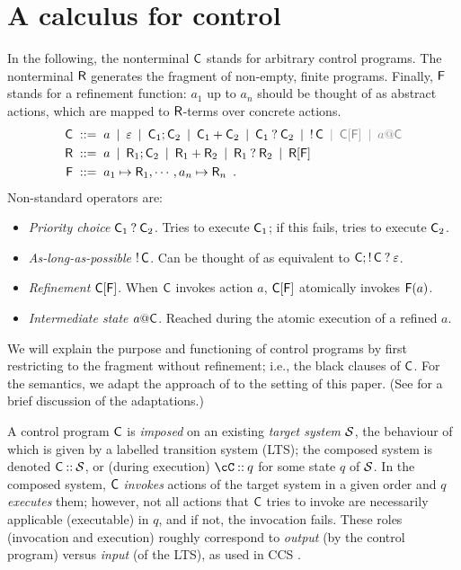 \section{A calculus for control}
\label{sec:calculus}

In the following, the nonterminal $\mathsf{C}$ stands for arbitrary control programs. The nonterminal $\mathsf{R}$ generates the fragment of non-empty, finite programs. Finally, $\mathsf{F}$ stands for a refinement function: $a_1$ up to $a_n$ should be thought of as abstract actions, which are mapped to $\mathsf{R}$-terms over concrete actions.
%
\begin{align*}
\rC & \ruleis a \rulemid \term \rulemid \rC_1;\rC_2 \rulemid \rC_1+\rC_2 \rulemid \rC_1\orelse \rC_2 \rulemid \alap \rC \color{gray} \rulemid \rC[\rF] \rulemid a@\rC \color{black} \\
\rR & \ruleis a \rulemid \rR_1;\rC_2 \rulemid \rR_1+\rR_2 \rulemid \rR_1\orelse \rR_2 \rulemid \rR[\rF] \\
\rF & \ruleis a_1 \mapsto \rR_1, \cdots, a_n\mapsto \rR_n \enspace.
\end{align*}
%
Non-standard operators are:
\begin{itemize}
\item \emph{Priority choice} $\mathsf{C}_1\mathbin{?} \mathsf{C}_2$. Tries to execute $\mathsf{C}_1$; if this fails, tries to execute $\mathsf{C}_2$.
\item \emph{As-long-as-possible} $\mathop{!} \mathsf{C}$. Can be thought of as equivalent to $\mathsf{C};\mathop{!} \mathsf{C}\mathbin{?} \varepsilon$.
\item \emph{Refinement} $\mathsf{C}[\mathsf{F}]$. When $\mathsf{C}$ invokes action $a$, $\mathsf{C}[\mathsf{F}]$ atomically invokes $\mathsf{F}(a)$.
\item \emph{Intermediate state $a@\mathsf{C}$}. Reached during the atomic execution of a refined $a$.
\end{itemize}
%
We will explain the purpose and functioning of control programs by first restricting to the fragment without refinement; i.e., the black clauses of $\mathsf{C}$. For the semantics, we adapt the approach of \cite{CCS-Priority-Choice} to the setting of this paper. (See  for a brief discussion of the adaptations.)

A control program $\mathsf{C}$ is \emph{imposed} on an existing \emph{target system} $\mathcal{S}$, the behaviour of which is given by a labelled transition system (LTS); the composed system is denoted $\mathsf{C}\mathbin{{:}{:}}\mathcal{S}$, or (during execution) $\cC\on q$ for some state $q$ of $\mathcal{S}$. In the composed system, $\mathsf{C}$ \emph{invokes} actions of the target system in a given order and $q$ \emph{executes} them; however, not all actions that $\mathsf{C}$ tries to invoke are necessarily applicable (executable) in $q$, and if not, the invocation fails. These roles (invocation and execution) roughly correspond to \emph{output} (by the control program) versus \emph{input} (of the LTS), as used in CCS \cite{CCS}.


